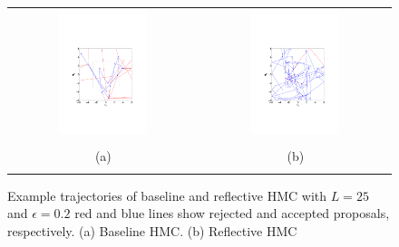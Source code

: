 \documentclass{article} %
\begin{document}
\begin{figure}
\setlength{\tabcolsep}{0em}
\vspace{-1mm}
\begin{center}
\begin{tabular}{cc}
\includegraphics[trim={3.2cm 6cm 3.2cm 9cm},clip,width=0.49\textwidth]{../plots3/BaselineHMC_l25_eps0_2_log_scatter2D.pdf} 
&\includegraphics[trim={3.2cm 6cm 3cm 9cm},clip,width=0.49\textwidth]{../plots3/ReflectiveHMC_l25_eps0_2_log_scatter2D.pdf}  \\
\vspace{-3.5mm}
\\
   \footnotesize(a) 
& \footnotesize(b) 
\\
\multicolumn{2}{c}{}
\end{tabular}
\end{center}
\vspace{-8mm}
\caption{\footnotesize
Example trajectories of baseline and reflective HMC with $L=25$ and $\epsilon=0.2$ red and blue lines show rejected and accepted proposals, respectively. (a) Baseline HMC. (b) Reflective HMC}
\vspace{-10pt}
\end{figure}
\end{document}
